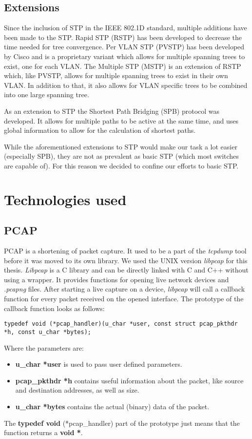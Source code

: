 \subsection*{Extensions}
Since the inclusion of STP in the IEEE 802.1D\cite{802.1D} standard, multiple additions have been made to the STP.
Rapid STP (RSTP) has been developed to decrease the time needed for tree convergence.
Per VLAN STP (PVSTP) has been developed by Cisco and is a proprietary variant which allows for multiple spanning trees to exist, one for each VLAN.
The Multiple STP (MSTP) is an extension of RSTP which, like PVSTP, allows for multiple spanning trees to exist in their own VLAN.
In addition to that, it also allows for VLAN specific trees to be combined into one large spanning tree.

As an extension to STP the Shortest Path Bridging (SPB)\cite{spb} protocol was developed.
It allows for multiple paths to be active at the same time, and uses global information to allow for the calculation of shortest paths.

While the aforementioned extensions to STP would make our task a lot easier (especially SPB), they are not as prevalent as basic STP (which most switches are capable of).
For this reason we decided to confine our efforts to basic STP.

\section{Technologies used}
\subsection*{PCAP}
\label{pcap}
PCAP\cite{pcap} is a shortening of packet capture.
It used to be a part of the \textit{tcpdump} tool before it was moved to its own library.
We used the UNIX version \textit{libpcap} for this thesis.
\textit{Libpcap} is a C library and can be directly linked with C and C++ without using a wrapper.
It provides functions for opening live network devices and \textit{.pcapng} files.
After starting a live capture on a device, \textit{libpcap} will call a callback function for every packet received on the opened interface.
The prototype of the callback function looks as follows:
\begin{lstlisting}[caption=Pcap Callback Prototype]
typedef void (*pcap_handler)(u_char *user, const struct pcap_pkthdr *h, const u_char *bytes);
\end{lstlisting}
Where the parameters are:
\begin{itemize}
    \item \textbf{u\_char *user} is used to pass user defined parameters.
    \item \textbf{pcap\_pkthdr *h} contains useful information about the packet, like source and destination addresses, as well as size.
    \item \textbf{u\_char *bytes} contains the actual (binary) data of the packet.
\end{itemize}
The \textbf{typedef void} (*pcap\_handler) part of the prototype just means that the function returns a \textbf{void *}.

